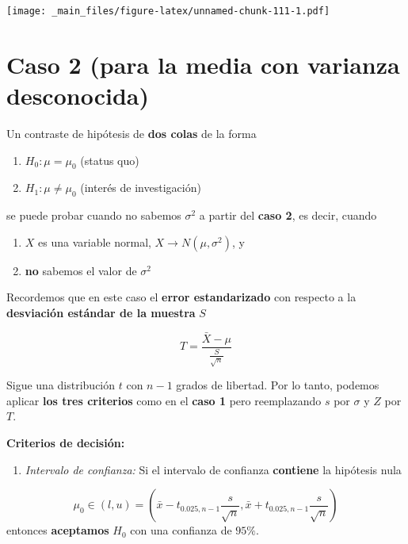 \documentclass[
]{book}
\providecommand{\tightlist}{%
  \setlength{\itemsep}{0pt}\setlength{\parskip}{0pt}}
\begin{document}
\texttt{[image: \_main\_files/figure-latex/unnamed-chunk-111-1.pdf]}

\hypertarget{caso-2-para-la-media-con-varianza-desconocida}{%
\section{Caso 2 (para la media con varianza desconocida)}\label{caso-2-para-la-media-con-varianza-desconocida}}

Un contraste de hipótesis de \textbf{dos colas} de la forma

\begin{enumerate}
\def\labelenumi{\alph{enumi}.}
\tightlist
\item
  \(H_0:\mu = \mu_0\) (status quo)
\item
  \(H_1:\mu \neq \mu_0\) (interés de investigación)
\end{enumerate}

se puede probar cuando no sabemos \(\sigma^2\) a partir del \textbf{caso 2}, es decir, cuando

\begin{enumerate}
\def\labelenumi{\arabic{enumi}.}
\tightlist
\item
  \(X\) es una variable normal, \(X \rightarrow N(\mu, \sigma^2)\), y
\item
  \textbf{no} sabemos el valor de \(\sigma^2\)
\end{enumerate}

Recordemos que en este caso el \textbf{error estandarizado} con respecto a la \textbf{desviación estándar de la muestra} \(S\)

\[T=\frac{\bar{X}-\mu}{\frac{S}{\sqrt{n}}}\]

Sigue una distribución \(t\) con \(n-1\) grados de libertad. Por lo tanto, podemos aplicar \textbf{los tres criterios} como en el \textbf{caso 1} pero reemplazando \(s\) por \(\sigma\) y \(Z\) por \(T\).

\textbf{Criterios de decisión:}

\begin{enumerate}
\def\labelenumi{\arabic{enumi}.}
\tightlist
\item
  \emph{Intervalo de confianza:} Si el intervalo de confianza \textbf{contiene} la hipótesis nula
\end{enumerate}

\[\mu_0\in (l,u)=(\bar{x}-t_{0.025,n-1} \frac{s}{\sqrt{n}}, \bar{x}+t_{0.025, n-1} \frac{s}{\sqrt{n}})\] entonces \textbf{aceptamos} \(H_0\) con una confianza de \(95\%\).
\end{document}
